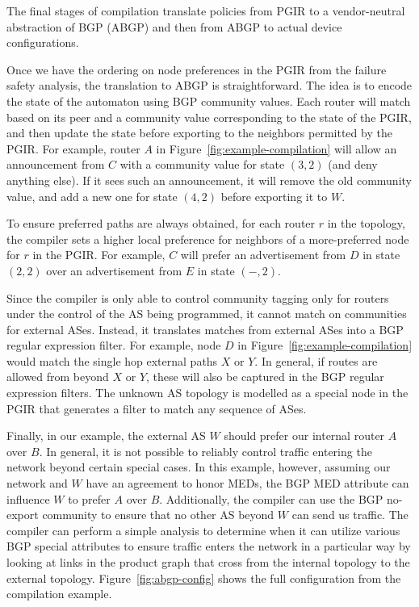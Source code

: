 The final stages of compilation translate policies from PGIR to a  vendor-neutral abstraction of BGP (ABGP) and then from ABGP to actual device configurations.


Once we have the ordering on node preferences in the PGIR from the failure safety analysis, the translation to ABGP is straightforward. The idea is to encode the state of the automaton using BGP community values. Each router will match based on its peer and a community value corresponding to the state of the PGIR, and then update the state before exporting to the neighbors permitted by the PGIR. For example, router $A$ in Figure~\ref{fig:example-compilation} will allow an announcement from $C$ with a community value for state $(3,2)$ (and deny anything else). If it sees such an announcement, it will remove the old community value, and add a new one for state $(4,2)$ before exporting it to $W$.

To ensure preferred paths are always obtained, for each router $r$ in the topology, the compiler sets a higher local preference for neighbors of a more-preferred node for $r$ in the PGIR. For example, $C$ will prefer an advertisement from $D$ in state $(2,2)$ over an advertisement from $E$ in state $(-,2)$.

Since the compiler is only able to control community tagging only for routers under the control of the AS being programmed, it cannot match on communities for external ASes. Instead, it translates matches from external ASes into a BGP regular expression filter. For example, node $D$ in Figure~\ref{fig:example-compilation} would match the single hop external paths $X$ or $Y$. In general, if routes are allowed from beyond $X$ or $Y$, these will also be captured in the BGP regular expression filters. The unknown AS topology is modelled as a special node in the PGIR that generates a filter to match any sequence of ASes.

Finally, in our example, the external AS $W$ should prefer our internal router $A$ over $B$. In general, it is not possible to reliably control traffic entering the network beyond certain special cases. In this example, however, assuming our network and $W$ have an agreement to honor MEDs, the BGP MED attribute can influence $W$ to prefer $A$ over $B$. Additionally, the compiler can use the BGP no-export community to ensure that no other AS beyond $W$ can send us traffic. The compiler can perform a simple analysis to determine when it can utilize various BGP special attributes to ensure traffic enters the network in a particular way by looking at links in the product graph that cross from the internal topology to the external topology. 
Figure~\ref{fig:abgp-config} shows the full configuration from the compilation example. 

